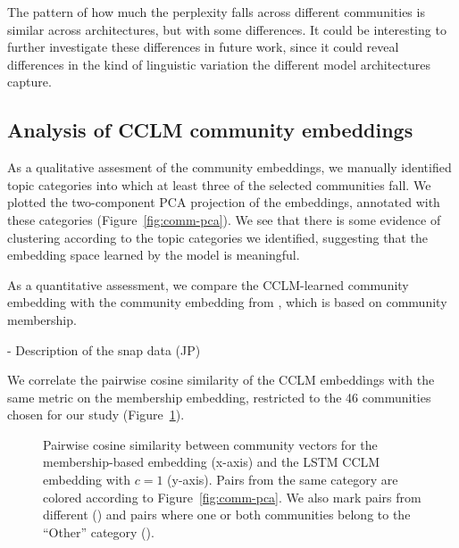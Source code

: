 \documentclass[11pt,a4paper]{article}
\begin{document}
The pattern of how much the perplexity falls across different communities
is similar across architectures, but with some differences.
It could be interesting to further investigate these differences in future work,
since it could reveal differences in the kind of linguistic variation the different
model architectures capture.

\begin{table*}
  \footnotesize
  \centering
  
  \caption{Mean model test perplexity per community.}
  \label{tab:model-ppls}
\end{table*}

\subsection{Analysis of CCLM community embeddings}

As a qualitative assesment of the community embeddings, 
we manually identified topic categories into which at least three
of the selected communities fall. 
We plotted the two-component PCA projection of the embeddings,
annotated with these categories (Figure~\ref{fig:comm-pca}).
We see that there is some evidence of clustering according to
the topic categories we identified,
suggesting that the embedding space learned by the model is meaningful.

\begin{figure*}
\caption{Community embedding PCA of the best LSTM (left, $c=1$) and transformer (right, $c=3$) models.}
\label{fig:comm-pca}
\end{figure*}

As a quantitative assessment,
we compare the CCLM-learned community embedding with the community embedding from \citet{Kumar2018},
which is based on community membership. 

- Description of the snap data (JP)

We correlate the pairwise cosine similarity of the
CCLM embeddings with the same metric on the membership embedding,
restricted to the 46 communities chosen for our study
(Figure~\ref{fig:pairwise-comm-sim}).

\begin{figure}
  \caption{Pairwise cosine similarity between community vectors for 
    the membership-based embedding (x-axis) and
  the LSTM CCLM embedding with $c=1$ (y-axis). 
  Pairs from the same category are colored according to Figure~\ref{fig:comm-pca}.
  We also mark pairs from different (\texttimes) and pairs where one or both
  communities belong to the ``Other'' category (\textbigcircle).
  }
  \label{fig:pairwise-comm-sim}
\end{figure}
\end{document}
